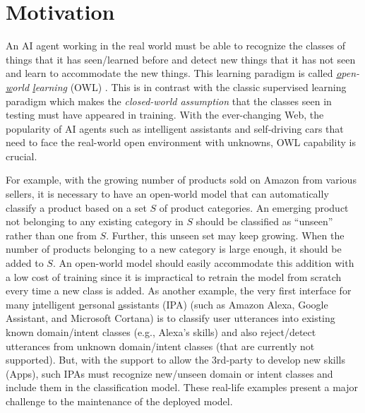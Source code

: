\section{Motivation}
An AI agent working in the real world must be able to recognize the classes of things that it has seen/learned before and detect new things that it has not seen and learn to accommodate the new things. This learning paradigm is called \textit{\underline{o}pen-\underline{w}orld \underline{l}earning} (OWL)
\cite{chen2018lifelong,bendale2015towards,fei2016learning}. 
This is in contrast with the classic supervised learning paradigm which makes the \textit{closed-world assumption} that the classes seen in testing must have appeared in training. With the ever-changing Web, the popularity of AI agents such as intelligent assistants and self-driving cars that need to face the real-world open environment with unknowns, OWL capability is crucial.

For example, with the growing number of products sold on Amazon from various sellers, it is necessary to have an open-world model that can automatically classify a product based on a set $S$ of product categories.
An emerging product not belonging to any existing category in $S$ should be classified as ``unseen'' rather than one from $S$.
Further, this unseen set may keep growing. When the number of products belonging to a new category is large enough, it should be added to $S$.
An open-world model should easily accommodate this addition with a low cost of training since it is impractical to retrain the model from scratch every time a new class is added.
As another example, the very first interface for many \underline{i}ntelligent \underline{p}ersonal \underline{a}ssistants (IPA) (such as Amazon Alexa, Google Assistant, and Microsoft Cortana) is to classify user utterances into existing known domain/intent classes (e.g., Alexa's skills) and also 
reject/detect utterances from unknown domain/intent classes (that are currently not supported).
But, with the support to allow the 3rd-party to develop new skills (Apps), such IPAs must recognize new/unseen domain or intent classes and include them in the classification model. These real-life examples present a major challenge to the maintenance of the deployed model.

